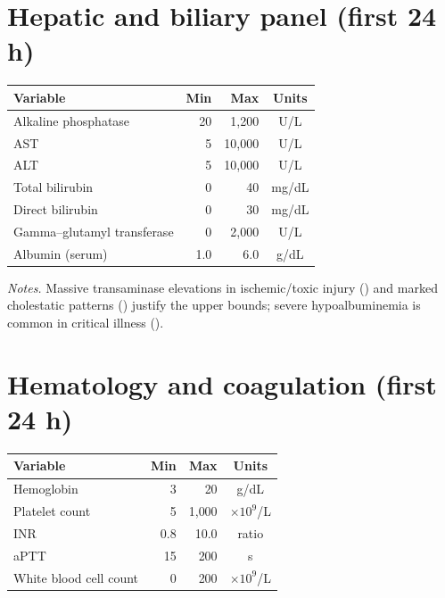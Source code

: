 \vspace{0.75\baselineskip}
\section*{Hepatic and biliary panel (first 24 h)}
\vspace{0.75\baselineskip}
\begin{table}[ht!]\centering\small
\begin{tabular}{lrrc}
\toprule
\textbf{Variable} & \textbf{Min} & \textbf{Max} & \textbf{Units} \\
\midrule
Alkaline phosphatase & 20 & 1{,}200 & U/L \\
AST & 5 & 10{,}000 & U/L \\
ALT & 5 & 10{,}000 & U/L \\
Total bilirubin & 0 & 40 & mg/dL \\
Direct bilirubin & 0 & 30 & mg/dL \\
Gamma–glutamyl transferase & 0 & 2{,}000 & U/L \\
Albumin (serum) & 1.0 & 6.0 & g/dL \\
\bottomrule
\end{tabular}
\end{table}

\noindent\textit{Notes.} Massive transaminase elevations in ischemic/toxic injury (\citealt{ALT1000,ALF_Acet}) and marked cholestatic patterns (\citealt{MayoALP}) justify the upper bounds; severe hypoalbuminemia is common in critical illness (\citealt{StatPearlsAlbumin}).

\vspace{0.75\baselineskip}
\section*{Hematology and coagulation (first 24 h)}
\vspace{0.75\baselineskip}
\begin{table}[ht!]\centering\small
\begin{tabular}{lrrc}
\toprule
\textbf{Variable} & \textbf{Min} & \textbf{Max} & \textbf{Units} \\
\midrule
Hemoglobin & 3 & 20 & g/dL \\
Platelet count & 5 & 1{,}000 & $\times 10^9$/L \\
INR & 0.8 & 10.0 & ratio \\
aPTT & 15 & 200 & s \\
White blood cell count & 0 & 200 & $\times 10^9$/L \\
\bottomrule
\end{tabular}
\end{table}

